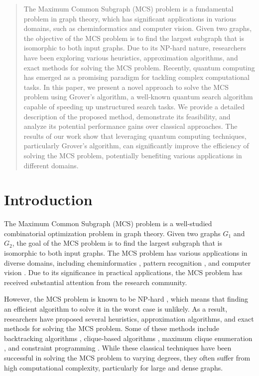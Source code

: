 \begin{abstract}
The Maximum Common Subgraph (MCS) problem is a fundamental problem in graph theory, which has significant applications in various domains, such as cheminformatics and computer vision. Given two graphs, the objective of the MCS problem is to find the largest subgraph that is isomorphic to both input graphs. Due to its NP-hard nature, researchers have been exploring various heuristics, approximation algorithms, and exact methods for solving the MCS problem. Recently, quantum computing has emerged as a promising paradigm for tackling complex computational tasks. In this paper, we present a novel approach to solve the MCS problem using Grover's algorithm, a well-known quantum search algorithm capable of speeding up unstructured search tasks. We provide a detailed description of the proposed method, demonstrate its feasibility, and analyze its potential performance gains over classical approaches. The results of our work show that leveraging quantum computing techniques, particularly Grover's algorithm, can significantly improve the efficiency of solving the MCS problem, potentially benefiting various applications in different domains.
\end{abstract}

\section{Introduction}

The Maximum Common Subgraph (MCS) problem is a well-studied combinatorial optimization problem in graph theory. Given two graphs $G_1$ and $G_2$, the goal of the MCS problem is to find the largest subgraph that is isomorphic to both input graphs. The MCS problem has various applications in diverse domains, including cheminformatics \cite{raymond2002maximum}, pattern recognition \cite{bunke1997graph}, and computer vision \cite{conte2004thirty}. Due to its significance in practical applications, the MCS problem has received substantial attention from the research community.

However, the MCS problem is known to be NP-hard \cite{garey1979computers}, which means that finding an efficient algorithm to solve it in the worst case is unlikely. As a result, researchers have proposed several heuristics, approximation algorithms, and exact methods for solving the MCS problem. Some of these methods include backtracking algorithms \cite{mcgregor1982backtrack}, clique-based algorithms \cite{bron1973algorithm}, maximum clique enumeration \cite{akutsu2007approximation}, and constraint programming \cite{solnon2010all}. While these classical techniques have been successful in solving the MCS problem to varying degrees, they often suffer from high computational complexity, particularly for large and dense graphs.

